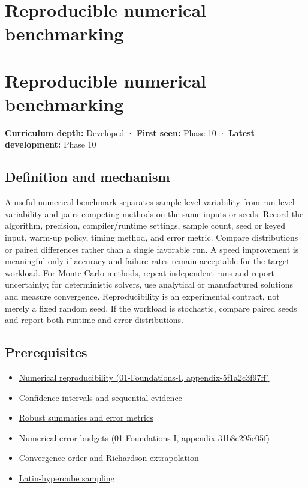 \hypertarget{appendix-b9db93e28371}{}
\section*{Reproducible numerical benchmarking}
\section{Reproducible numerical benchmarking}\label{appendix-b9db93e28371-reproducible-numerical-benchmarking}

\textbf{Curriculum depth:} Developed · \textbf{First seen:} Phase 10 · \textbf{Latest development:} Phase 10

\subsection{Definition and mechanism}\label{appendix-b9db93e28371-definition-and-mechanism}

A useful numerical benchmark separates sample-level variability from run-level variability and pairs competing methods on the same inputs or seeds. Record the algorithm, precision, compiler/runtime settings, sample count, seed or keyed input, warm-up policy, timing method, and error metric. Compare distributions or paired differences rather than a single favorable run. A speed improvement is meaningful only if accuracy and failure rates remain acceptable for the target workload. For Monte Carlo methods, repeat independent runs and report uncertainty; for deterministic solvers, use analytical or manufactured solutions and measure convergence. Reproducibility is an experimental contract, not merely a fixed random seed. If the workload is stochastic, compare paired seeds and report both runtime and error distributions.

\subsection{Prerequisites}\label{appendix-b9db93e28371-prerequisites}

\begin{itemize}
\tightlist
\item
  \href{../01-Foundations-I/main.pdf\#nameddest=appendix-5f1a2c3f97ff}{Numerical reproducibility (01-Foundations-I, appendix-5f1a2c3f97ff)}
\item
  \hyperref[appendix-c83016554b1e]{Confidence intervals and sequential evidence}
\item
  \hyperref[appendix-bcc44e9d3d02]{Robust summaries and error metrics}
\item
  \href{../01-Foundations-I/main.pdf\#nameddest=appendix-31b8c295e05f}{Numerical error budgets (01-Foundations-I, appendix-31b8c295e05f)}
\item
  \hyperref[appendix-aca80b6bf17a]{Convergence order and Richardson extrapolation}
\item
  \hyperref[appendix-1c5e85693a06]{Latin-hypercube sampling}
\end{itemize}

